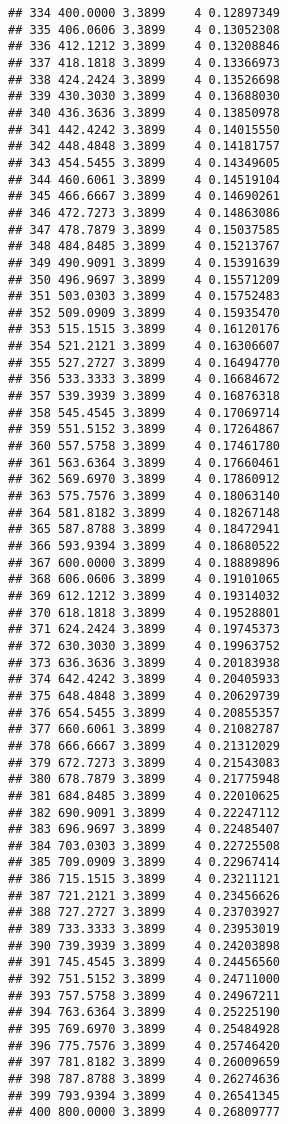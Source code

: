 \documentclass[
]{article}
\begin{document}
\begin{verbatim}
## 334 400.0000 3.3899    4 0.12897349
## 335 406.0606 3.3899    4 0.13052308
## 336 412.1212 3.3899    4 0.13208846
## 337 418.1818 3.3899    4 0.13366973
## 338 424.2424 3.3899    4 0.13526698
## 339 430.3030 3.3899    4 0.13688030
## 340 436.3636 3.3899    4 0.13850978
## 341 442.4242 3.3899    4 0.14015550
## 342 448.4848 3.3899    4 0.14181757
## 343 454.5455 3.3899    4 0.14349605
## 344 460.6061 3.3899    4 0.14519104
## 345 466.6667 3.3899    4 0.14690261
## 346 472.7273 3.3899    4 0.14863086
## 347 478.7879 3.3899    4 0.15037585
## 348 484.8485 3.3899    4 0.15213767
## 349 490.9091 3.3899    4 0.15391639
## 350 496.9697 3.3899    4 0.15571209
## 351 503.0303 3.3899    4 0.15752483
## 352 509.0909 3.3899    4 0.15935470
## 353 515.1515 3.3899    4 0.16120176
## 354 521.2121 3.3899    4 0.16306607
## 355 527.2727 3.3899    4 0.16494770
## 356 533.3333 3.3899    4 0.16684672
## 357 539.3939 3.3899    4 0.16876318
## 358 545.4545 3.3899    4 0.17069714
## 359 551.5152 3.3899    4 0.17264867
## 360 557.5758 3.3899    4 0.17461780
## 361 563.6364 3.3899    4 0.17660461
## 362 569.6970 3.3899    4 0.17860912
## 363 575.7576 3.3899    4 0.18063140
## 364 581.8182 3.3899    4 0.18267148
## 365 587.8788 3.3899    4 0.18472941
## 366 593.9394 3.3899    4 0.18680522
## 367 600.0000 3.3899    4 0.18889896
## 368 606.0606 3.3899    4 0.19101065
## 369 612.1212 3.3899    4 0.19314032
## 370 618.1818 3.3899    4 0.19528801
## 371 624.2424 3.3899    4 0.19745373
## 372 630.3030 3.3899    4 0.19963752
## 373 636.3636 3.3899    4 0.20183938
## 374 642.4242 3.3899    4 0.20405933
## 375 648.4848 3.3899    4 0.20629739
## 376 654.5455 3.3899    4 0.20855357
## 377 660.6061 3.3899    4 0.21082787
## 378 666.6667 3.3899    4 0.21312029
## 379 672.7273 3.3899    4 0.21543083
## 380 678.7879 3.3899    4 0.21775948
## 381 684.8485 3.3899    4 0.22010625
## 382 690.9091 3.3899    4 0.22247112
## 383 696.9697 3.3899    4 0.22485407
## 384 703.0303 3.3899    4 0.22725508
## 385 709.0909 3.3899    4 0.22967414
## 386 715.1515 3.3899    4 0.23211121
## 387 721.2121 3.3899    4 0.23456626
## 388 727.2727 3.3899    4 0.23703927
## 389 733.3333 3.3899    4 0.23953019
## 390 739.3939 3.3899    4 0.24203898
## 391 745.4545 3.3899    4 0.24456560
## 392 751.5152 3.3899    4 0.24711000
## 393 757.5758 3.3899    4 0.24967211
## 394 763.6364 3.3899    4 0.25225190
## 395 769.6970 3.3899    4 0.25484928
## 396 775.7576 3.3899    4 0.25746420
## 397 781.8182 3.3899    4 0.26009659
## 398 787.8788 3.3899    4 0.26274636
## 399 793.9394 3.3899    4 0.26541345
## 400 800.0000 3.3899    4 0.26809777
\end{verbatim}
\end{document}
